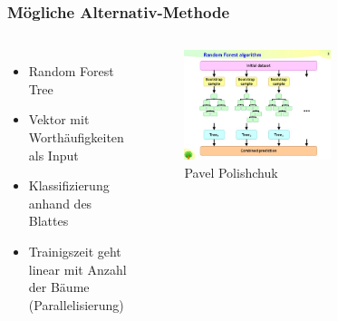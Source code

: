 \documentclass[aspectratio=1610, professionalfonts, 9pt]{beamer}
\begin{document}
  \begin{frame}
    \frametitle{Mögliche Alternativ-Methode}
    \begin{columns}
    \begin{itemize}
      \item Random Forest Tree
      \item Vektor mit Worthäufigkeiten als Input
      \item Klassifizierung anhand des Blattes
      \item Trainigszeit geht linear mit Anzahl der Bäume (Parallelisierung)
    \end{itemize}

    \begin{figure}
          \includegraphics[width=0.6\textwidth]{pictures/RF.jpg}
          \caption{Pavel Polishchuk}
          \label{}
      \end{figure}
    \end{columns}
    \end{frame}

  \begin{frame}
    \printbibliography
  \end{frame}
\end{document}
